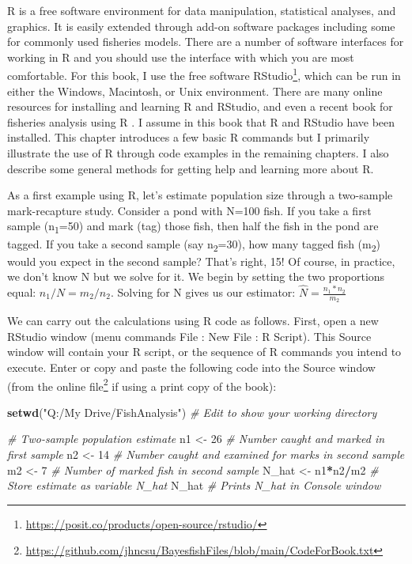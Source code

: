 \documentclass[
]{krantz}
\makeatletter
\newenvironment{Shaded}{\begin{snugshade}}{\end{snugshade}}
\newcommand{\CommentTok}[1]{\textcolor[rgb]{0.37,0.37,0.37}{\textit{#1}}}
\newcommand{\DecValTok}[1]{\textcolor[rgb]{0.06,0.06,0.06}{#1}}
\newcommand{\FunctionTok}[1]{\textcolor[rgb]{0.27,0.27,0.27}{\textbf{#1}}}
\newcommand{\NormalTok}[1]{#1}
\newcommand{\OtherTok}[1]{\textcolor[rgb]{0.37,0.37,0.37}{#1}}
\newcommand{\SpecialCharTok}[1]{\textcolor[rgb]{0.43,0.43,0.43}{\textbf{#1}}}
\newcommand{\StringTok}[1]{\textcolor[rgb]{0.5,0.5,0.5}{#1}}
\renewcommand{\href}[2]{#2\footnote{\url{#1}}}
\newenvironment{kframe}{%
\medskip{}
\setlength{\fboxsep}{.8em}
 \def\at@end@of@kframe{}%
 \ifinner\ifhmode%
  \def\at@end@of@kframe{\end{minipage}}%
  \begin{minipage}{\columnwidth}%
 \fi\fi%
 \def\FrameCommand##1{\hskip\@totalleftmargin \hskip-\fboxsep
 \colorbox{shadecolor}{##1}\hskip-\fboxsep
     \hskip-\linewidth \hskip-\@totalleftmargin \hskip\columnwidth}%
 \MakeFramed {\advance\hsize-\width
   \@totalleftmargin\z@ \linewidth\hsize
   \@setminipage}}%
 {\par\unskip\endMakeFramed%
 \at@end@of@kframe}
\renewenvironment{Shaded}{\begin{kframe}}{\end{kframe}}
\makeatother
\begin{document}
R \citep{R-base} is a free software environment for data manipulation, statistical analyses, and graphics. It is easily extended through add-on software packages including some for commonly used fisheries models. There are a number of software interfaces for working in R and you should use the interface with which you are most comfortable. For this book, I use the free software \href{https://posit.co/products/open-source/rstudio/}{RStudio}, which can be run in either the Windows, Macintosh, or Unix environment. There are many online resources for installing and learning R and RStudio, and even a recent book for fisheries analysis using R \citep{ogle_2016}. I assume in this book that R and RStudio have been installed. This chapter introduces a few basic R commands but I primarily illustrate the use of R through code examples in the remaining chapters. I also describe some general methods for getting help and learning more about R.

As a first example using R, let's estimate population size through a two-sample mark-recapture study. Consider a pond with N=100 fish. If you take a first sample (n\textsubscript{1}=50) and mark (tag) those fish, then half the fish in the pond are tagged. If you take a second sample (say n\textsubscript{2}=30), how many tagged fish (m\textsubscript{2}) would you expect in the second sample? That's right, 15! Of course, in practice, we don't know N but we solve for it. We begin by setting the two proportions equal: \(n_1/N=m_2/n_2\). Solving for N gives us our estimator: \(\hat{N} = \frac{n_1*n_2}{m_2}\)

We can carry out the calculations using R code as follows. First, open a new RStudio window (menu commands File : New File : R Script). This Source window will contain your R script, or the sequence of R commands you intend to execute. Enter or copy and paste the following code into the Source window (from the online \href{https://github.com/jhncsu/BayesfishFiles/blob/main/CodeForBook.txt}{file} if using a print copy of the book):

\begin{Shaded}
\begin{Highlighting}[]
\FunctionTok{setwd}\NormalTok{(}\StringTok{"Q:/My Drive/FishAnalysis"}\NormalTok{) }\CommentTok{\# Edit to show your working directory}

\CommentTok{\# Two{-}sample population estimate}
\NormalTok{n1 }\OtherTok{\textless{}{-}} \DecValTok{26} \CommentTok{\# Number caught and marked in first sample}
\NormalTok{n2 }\OtherTok{\textless{}{-}} \DecValTok{14} \CommentTok{\# Number caught and examined for marks in second sample}
\NormalTok{m2 }\OtherTok{\textless{}{-}} \DecValTok{7} \CommentTok{\# Number of marked fish in second sample}
\NormalTok{N\_hat }\OtherTok{\textless{}{-}}\NormalTok{ n1}\SpecialCharTok{*}\NormalTok{n2}\SpecialCharTok{/}\NormalTok{m2 }\CommentTok{\# Store estimate as variable N\_hat}
\NormalTok{N\_hat }\CommentTok{\# Prints N\_hat in Console window}
\end{Highlighting}
\end{Shaded}
\end{document}
